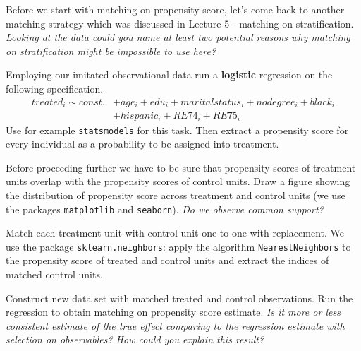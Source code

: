 \begin{boenumerate}

\item Before we start with matching on propensity score, let's come back to another matching strategy which was discussed in Lecture 5 - matching on stratification. \emph{Looking at the data could you name at least two potential reasons why matching on stratification might be impossible to use here?}

\item Employing our imitated observational data run a \textbf{logistic} regression on the following specification.
  \begin{align*}
    treated_i \sim const. &+ age_i + edu_i + maritalstatus_i + nodegree_i + black_i\\
			  &+ hispanic_i + RE74_i + RE75_i
  \end{align*}
Use for example \texttt{statsmodels} for this task.
Then extract a propensity score for every individual as a probability to be assigned into treatment. 

\item Before proceeding further we have to be sure that propensity scores of treatment units overlap with the propensity scores of control units. Draw a figure  showing the distribution of propensity score across treatment and control units (we use the packages \texttt{matplotlib} and \texttt{seaborn}). \emph{Do we observe common support?}

\item Match each treatment unit with control unit one-to-one with replacement. We use the package \texttt{sklearn.neighbors}: apply the algorithm \texttt{NearestNeighbors} to the propensity score of treated and control units and extract the indices of matched control units. 

\item Construct new data set with matched treated and control observations. Run the regression to obtain matching on propensity score estimate. \emph{Is it more or less consistent estimate of the true effect comparing to the regression estimate with selection on observables? How could you explain this result?}

\end{boenumerate}

\nocite{CPS}





